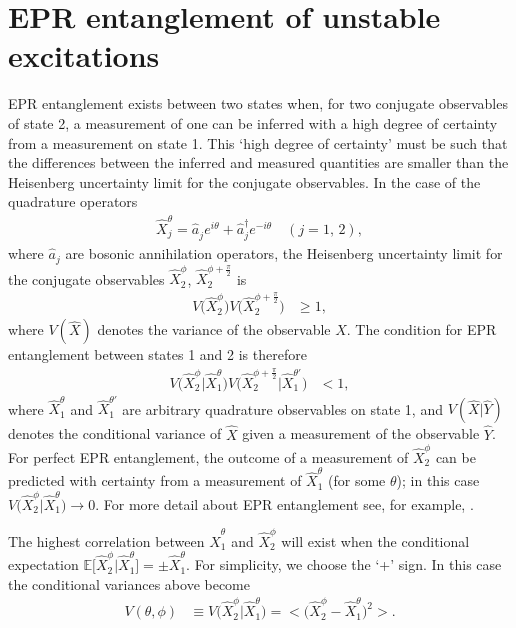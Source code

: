 \section{EPR entanglement of unstable excitations}
\label{FloquetAppendix:EPREntanglement}

EPR entanglement exists between two states when, for two conjugate observables of state 2, a measurement of one can be inferred with a high degree of certainty from a measurement on state 1. This `high degree of certainty' must be such that the differences between the inferred and measured quantities are smaller than the Heisenberg uncertainty limit for the conjugate observables. In the case of the quadrature operators
\begin{align}
    \hat{X}_j^\theta = \hat{a}_j^{\phantom{\dagger}} e^{i \theta} + \hat{a}_j^\dagger e^{-i \theta} \quad (j = 1,\, 2),
\end{align}
where $\hat{a}_j$ are bosonic annihilation operators, the Heisenberg uncertainty limit for the conjugate observables $\hat{X}_2^\phi$, $\hat{X}_2^{\phi + \frac{\pi}{2}}$ is
\begin{align}
    V\big(\hat{X}_2^\phi\big) V\big(\hat{X}_2^{\phi + \frac{\pi}{2}}\big) &\geq 1,
\end{align}
where $V(\hat{X})$ denotes the variance of the observable $\hat{X}$. The condition for EPR entanglement between states 1 and 2 is therefore
\begin{align}
    V\big(\hat{X}_2^\phi \big| \hat{X}_1^\theta\big) V\big(\hat{X}_2^{\phi + \frac{\pi}{2}} \big| \hat{X}_1^{\theta'}\big) &< 1, \label{FloquetAppendix:EPRCondition}
\end{align}
where $\hat{X}_1^\theta$ and $\hat{X}_1^{\theta'}$ are arbitrary quadrature observables on state 1, and $V(\hat{X} | \hat{Y})$ denotes the conditional variance of $\hat{X}$ given a measurement of the observable $\hat{Y}$. For perfect EPR entanglement, the outcome of a measurement of $\hat{X}_2^\phi$ can be predicted with certainty from a measurement of $\hat{X}_1^\theta$ (for some $\theta$); in this case $V\big(\hat{X}_2^\phi \big| \hat{X}_1^\theta\big) \rightarrow 0$. For more detail about EPR entanglement see, for example, \citep{WallsMilburn}.

The highest correlation between $\hat{X}_1^\theta$ and $\hat{X}_2^\phi$ will exist when the conditional expectation $\mathbb{E}\big[\hat{X}_2^\phi\big| \hat{X}_1^\theta\big] = \pm\hat{X}_1^\theta$. For simplicity, we choose the `+' sign. In this case the conditional variances above become
\begin{align}
    V(\theta, \phi) &\equiv V\big(\hat{X}_2^\phi \big| \hat{X}_1^{\theta}\big) = \big<\big(\hat{X}_2^\phi - \hat{X}_1^\theta\big)^2\big>.
\end{align}

